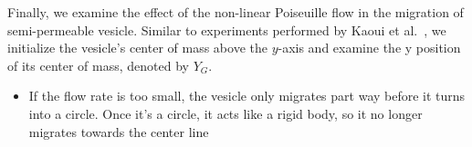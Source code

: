 \documentclass[9pt,twocolumn,twoside,lineno]{pnas-new}
\begin{document}
Finally, we examine the effect of the non-linear Poiseuille flow in the
migration of semi-permeable vesicle. Similar to experiments performed by
Kaoui et al.~\cite{kao-bir-mis2009}, we initialize the vesicle's
center of mass above the $y$-axis and examine the y position of its
center of mass, denoted by $Y_G$.

\begin{itemize}
  \item If the flow rate is too small, the vesicle only migrates part
    way before it turns into a circle. Once it's a circle, it acts like
    a rigid body, so it no longer migrates towards the center line
\end{itemize}





% 
 
\end{document}
